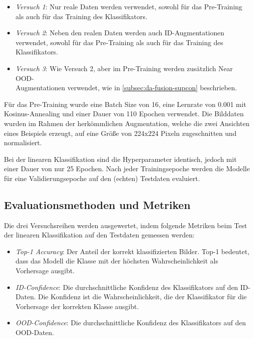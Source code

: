 \begin{itemize} %
	\item \emph{Versuch 1}: Nur reale Daten werden verwendet, sowohl für das Pre-Training als auch für das Training des Klassifikators.
	\item \emph{Versuch 2}: Neben den realen Daten werden auch ID-Augmentationen verwendet, sowohl für das Pre-Training als auch für das Training des Klassifikators.
	\item \emph{Versuch 3}: Wie Versuch 2, aber im Pre-Training werden zusätzlich Near OOD-\\Augmentationen verwendet, wie in \autoref{subsec:da-fusion-supcon} beschrieben.
\end{itemize}

Für das Pre-Training wurde eine Batch Size von 16, eine Lernrate von 0.001 mit Kosinus-Annealing und einer Dauer von 110 Epochen verwendet. Die Bilddaten wurden im Rahmen der herkömmlichen Augmentation, welche die zwei Ansichten eines Beispiels erzeugt, auf eine Größe von 224x224 Pixeln zugeschnitten und normalisiert.

Bei der linearen Klassifikation sind die Hyperparameter identisch, jedoch mit einer Dauer von nur 25 Epochen. Nach jeder Trainingsepoche werden die Modelle für eine Validierungsepoche auf den (echten) Testdaten evaluiert.

\subsection{Evaluationsmethoden und Metriken} \label{subsec:evaluation}

Die drei Versuchsreihen werden ausgewertet, indem folgende Metriken beim Test der linearen Klassifikation auf den Testdaten gemessen werden:

\begin{itemize}
	\item \emph{Top-1 Accuracy}: Der Anteil der korrekt klassifizierten Bilder. Top-1 bedeutet, dass das Modell die Klasse mit der höchsten Wahrscheinlichkeit als Vorhersage ausgibt.
	\item \emph{ID-Confidence}: Die durchschnittliche Konfidenz des Klassifikators auf den ID-Daten. Die Konfidenz ist die Wahrscheinlichkeit, die der Klassifikator für die Vorhersage der korrekten Klasse ausgibt.
	\item \emph{OOD-Confidence}: Die durchschnittliche Konfidenz des Klassifikators auf den OOD-Daten.
\end{itemize}

